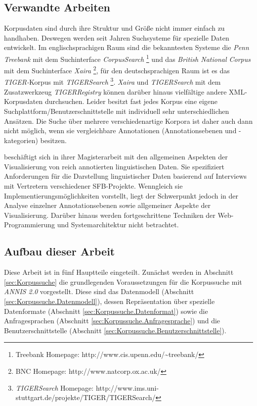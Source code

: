 \subsection{Verwandte Arbeiten}\label{sec:Verwandte Arbeiten}

Korpusdaten sind durch ihre Struktur und Größe nicht immer einfach zu handhaben. Deswegen werden seit Jahren Suchsysteme für spezielle Daten entwickelt. Im englischsprachigen Raum sind die bekanntesten Systeme die \emph{Penn Treebank} mit dem Suchinterface \emph{CorpusSearch} \citep[]{marcus1994building}\footnote{Treebank Homepage: http://www.cis.upenn.edu/\~{}treebank/} und das \emph{British National Corpus} mit dem Suchinterface \emph{Xaira} \citep[]{burnard2000reference}\footnote{BNC Homepage: http://www.natcorp.ox.ac.uk/}, für den deutschsprachigen Raum ist es das \emph{TIGER-}Korpus mit \emph{TIGERSearch} \citep[]{lezius-diss}\footnote{\emph{TIGERSearch} Homepage: http://www.ims.uni-stuttgart.de/projekte/TIGER/TIGERSearch/}. \emph{Xaira} und \emph{TIGERSearch} mit dem Zusatzwerkzeug \emph{TIGERRegistry} können darüber hinaus vielfältige andere XML-Korpusdaten durchsuchen. Leider besitzt fast jedes Korpus eine eigene Suchplattform/Benutzerschnittstelle mit individuell sehr unterschiedlichen Ansätzen. Die Suche über mehrere verschiedenartige Korpora ist daher auch dann nicht möglich, wenn sie vergleichbare Annotationen (Annotationsebenen und -kategorien) besitzen. 

\cite{futterleib2007} beschäftigt sich in ihrer Magisterarbeit mit den allgemeinen Aspekten der Visualisierung von reich annotierten linguistischen Daten. Sie spezifiziert Anforderungen für die Darstellung linguistischer Daten basierend auf Interviews mit Vertretern verschiedener SFB-Projekte. Wenngleich sie Implementierungsmöglichkeiten vorstellt, liegt der Schwerpunkt jedoch in der Analyse einzelner Annotationsebenen sowie allgemeiner Aspekte der Visualisierung. Darüber hinaus werden fortgeschrittene Techniken der Web-Programmierung und Systemarchitektur nicht betrachtet.

\subsection{Aufbau dieser Arbeit}

Diese Arbeit ist in fünf Hauptteile eingeteilt. Zunächst werden in Abschnitt \ref{sec:Korpussuche} die grundlegenden Voraussetzungen für die Korpussuche mit \emph{ANNIS 2.0} vorgestellt. Diese sind das Datenmodell (Abschnitt \ref{sec:Korpussuche.Datenmodell}), dessen Repräsentation über spezielle Datenformate (Abschnitt \ref{sec:Korpussuche.Datenformat}) sowie die Anfragesprachen (Abschnitt \ref{sec:Korpussuche.Anfragesprache}) und die Benutzerschnittstelle (Abschnitt \ref{sec:Korpussuche.Benutzerschnittstelle}).

